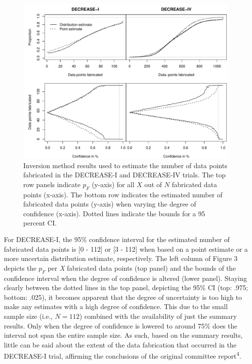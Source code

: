 \documentclass[]{article}
\begin{document}
\begin{figure}

{\centering \includegraphics[width=0.8\linewidth]{../figures/fig3} 

}

\caption{Inversion method results used to estimate the number of data points fabricated in the DECREASE-I and DECREASE-IV trials. The top row panels indicate $p_F$ (y-axis) for all $X$ out of $N$ fabricated data points (x-axis). The bottom row indicates the estimated number of fabricated data points (y-axis) when varying the degree of confidence (x-axis). Dotted lines indicate the bounds for a 95 percent CI.}\label{fig:figure 3}
\end{figure}

For DECREASE-I, the 95\% confidence interval for the estimated number of
fabricated data points is {[}0 - 112{]} or {[}3 - 112{]} when based on a
point estimate or a more uncertain distribution estimate, respectively.
The left column of Figure 3 depicts the \(p_F\) per \emph{X} fabricated
data points (top panel) and the bounds of the confidence interval when
the degree of confidence is altered (lower panel). Staying clearly
between the dotted lines in the top panel, depicting the 95\% CI (top:
.975; bottom: .025), it becomes apparent that the degree of uncertainty
is too high to make any estimates with a high degree of confidence. This
due to the small sample size (i.e., \(N=112\)) combined with the
availability of just the summary results. Only when the degree of
confidence is lowered to around 75\% does the interval not span the
entire sample size. As such, based on the summary results, little can be
said about the extent of the data fabrication that occurred in the
DECREASE-I trial, affirming the conclusions of the original committee
report\textsuperscript{4}.
\end{document}
